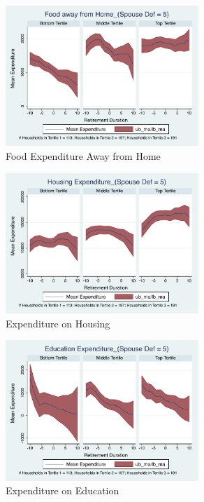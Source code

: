 \documentclass[11pt,onecolumn]{article}
\numberwithin{figure}{section}
\begin{document}
\begin{figure}[h]
	\caption{Food Expenditure Away from Home}
	\centering
	\includegraphics[width=0.65\textwidth]{../ConsumptionPostRetirement_by_SpouseDef_Cats/Smoothed/5/spouse_def_total_foodexp_away_real.pdf}
\end{figure}

\clearpage

\begin{figure}[h]
	\caption{Expenditure on Housing}
	\centering
	\includegraphics[width=0.65\textwidth]{../ConsumptionPostRetirement_by_SpouseDef_Cats/Smoothed/5/spouse_def_total_housing_real.pdf}
\end{figure}


\begin{figure}[h]
	\caption{Expenditure on Education}
	\centering
	\includegraphics[width=0.65\textwidth]{../ConsumptionPostRetirement_by_SpouseDef_Cats/Smoothed/5/spouse_def_total_education_real.pdf}
\end{figure}
\clearpage
\end{document}
